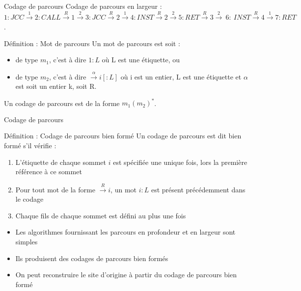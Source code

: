 \documentclass{beamer}
\begin{document}
\begin{frame}{Codage de parcours}
Codage de parcours en largeur :\\
$1: JCC\xrightarrow{1} 2: CALL\xrightarrow{R} 1\xrightarrow{2} 3: JCC\xrightarrow{R} 2\xrightarrow{1} 4: INST\xrightarrow{R} 2\xrightarrow{2} 5: RET \xrightarrow{R} 3 \xrightarrow{2}~6:~INST \xrightarrow{R} 4\xrightarrow{1} 7: RET$.

\begin{block}{Définition : Mot de parcours}
 Un mot de parcours est soit :
 \begin{itemize}
  \item de type $m_1$, c'est à dire $1:L$ où L est une étiquette, ou
  \item de type $m_2$, c'est à dire $\xrightarrow{\alpha}i[:L]$ où i est un entier, L est une étiquette et $\alpha$ est soit un entier k, soit R.
 \end{itemize}
 \label{def-mot-bien-forme}
\end{block}
Un codage de parcours est de la forme $m_1(m_2)^*$.
\end{frame}

\begin{frame}{Codage de parcours}

\begin{block}{Définition : Codage de parcours bien formé}
 Un codage de parcours est dit bien formé s'il vérifie :
\begin{enumerate}
 \item L'étiquette de chaque sommet $i$ est spécifiée une unique fois, lors la première référence à ce sommet
 \item Pour tout mot de la forme $\xrightarrow{R}i$, un mot $i:L$ est présent précédemment dans le codage
 \item Chaque fils de chaque sommet est défini au plus une fois
\end{enumerate} 
\label{def-codage-bien-forme}
\end{block}

\begin{itemize}
 \item Les algorithmes fournissant les parcours en profondeur et en largeur sont simples
 \item Ils produisent des codages de parcours bien formés
 \item On peut reconstruire le site d'origine à partir du codage de parcours bien formé
\end{itemize}
\end{frame}
\end{document}
